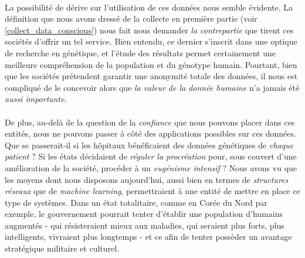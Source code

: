 \paragraph{} La possibilité de dérive sur l'utilisation de ces données nous semble évidente. La définition
que nous avons dressé de la collecte en première partie (voir \ref{collect_data_conscious}) nous fait nous 
demander \emph{la contrepartie} que tirent ces sociétés d'offrir un tel service. Bien entendu, ce dernier 
s'inscrit dans une optique de recherche en génétique, et l'étude des résultats permet certainement une
meilleure compréhension de la population et du génotype humain. Pourtant, bien que les sociétés prétendent
garantir une anonymité totale des données, il nous est compliqué de le concevoir alors que \emph{la valeur
de la donnée humaine} n'a jamais été \emph{aussi importante}. 

\paragraph{} De plus, au-delà de la question de la \emph{confiance} que nous pouvons placer dans ces entités,
nous ne pouvons passer à côté des applications possibles sur ces données. Que se passerait-il si les hôpitaux
bénéficaient des données génétiques de \emph{chaque patient} ? Si les états décidaient de \emph{réguler la
procréation} pour, sous couvert d'une amélioration de la société, procéder à un \emph{eugénisme intensif} ?
Nous avons vu que les moyens dont nous disposons aujourd'hui, aussi bien en termes de \emph{structures réseaux}
que de \emph{machine learning}, permettraient à une entité de mettre en place ce type de systèmes. Dans un état
totalitaire, comme en Corée du Nord par exemple, le gouvernement pourrait tenter d'établir une population
d'humains augmentés - qui résisteraient mieux aux maladies, qui seraient plus forts, plus intelligents, vivraient
plus longtemps - et ce afin de tenter possèder un avantage stratégique militaire et culturel.

